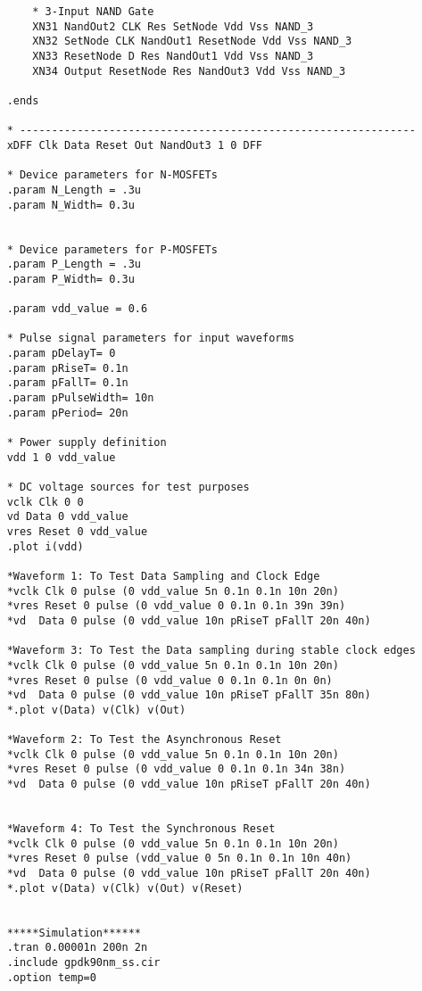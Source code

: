\begin{lstlisting}
        * 3-Input NAND Gate
        XN31 NandOut2 CLK Res SetNode Vdd Vss NAND_3 
        XN32 SetNode CLK NandOut1 ResetNode Vdd Vss NAND_3 
        XN33 ResetNode D Res NandOut1 Vdd Vss NAND_3 
        XN34 Output ResetNode Res NandOut3 Vdd Vss NAND_3 
    
    .ends
    
    * --------------------------------------------------------------
    xDFF Clk Data Reset Out NandOut3 1 0 DFF
    
    * Device parameters for N-MOSFETs
    .param N_Length = .3u
    .param N_Width= 0.3u 
    
    
    * Device parameters for P-MOSFETs
    .param P_Length = .3u
    .param P_Width= 0.3u 
    
    .param vdd_value = 0.6
    
    * Pulse signal parameters for input waveforms
    .param pDelayT= 0       
    .param pRiseT= 0.1n    
    .param pFallT= 0.1n     
    .param pPulseWidth= 10n
    .param pPeriod= 20n    
    
    * Power supply definition
    vdd 1 0 vdd_value        
    
    * DC voltage sources for test purposes
    vclk Clk 0 0               
    vd Data 0 vdd_value
    vres Reset 0 vdd_value
    .plot i(vdd)
    
    *Waveform 1: To Test Data Sampling and Clock Edge
    *vclk Clk 0 pulse (0 vdd_value 5n 0.1n 0.1n 10n 20n)     
    *vres Reset 0 pulse (0 vdd_value 0 0.1n 0.1n 39n 39n)       
    *vd  Data 0 pulse (0 vdd_value 10n pRiseT pFallT 20n 40n) 
    
    *Waveform 3: To Test the Data sampling during stable clock edges
    *vclk Clk 0 pulse (0 vdd_value 5n 0.1n 0.1n 10n 20n)     
    *vres Reset 0 pulse (0 vdd_value 0 0.1n 0.1n 0n 0n)       
    *vd  Data 0 pulse (0 vdd_value 10n pRiseT pFallT 35n 80n) 
    *.plot v(Data) v(Clk) v(Out)
    
    *Waveform 2: To Test the Asynchronous Reset
    *vclk Clk 0 pulse (0 vdd_value 5n 0.1n 0.1n 10n 20n)     
    *vres Reset 0 pulse (0 vdd_value 0 0.1n 0.1n 34n 38n)       
    *vd  Data 0 pulse (0 vdd_value 10n pRiseT pFallT 20n 40n)
    
    
    *Waveform 4: To Test the Synchronous Reset
    *vclk Clk 0 pulse (0 vdd_value 5n 0.1n 0.1n 10n 20n)     
    *vres Reset 0 pulse (vdd_value 0 5n 0.1n 0.1n 10n 40n)       
    *vd  Data 0 pulse (0 vdd_value 10n pRiseT pFallT 20n 40n)
    *.plot v(Data) v(Clk) v(Out) v(Reset)
    
    
    *****Simulation******
    .tran 0.00001n 200n 2n
    .include gpdk90nm_ss.cir
    .option temp=0
    
\end{lstlisting}
% 

% 

% 
